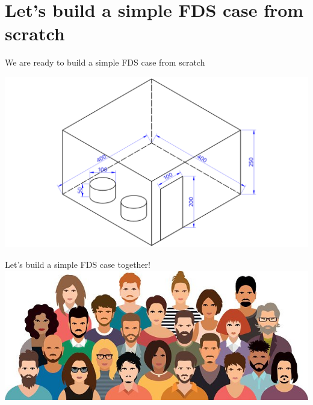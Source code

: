 \documentclass[aspectratio=169]{beamer}
\begin{document}
\section{Let's build a simple FDS case from scratch}
\begin{frame}[fragile]{}
  \centering
  \vfill
  {\fontsize{20}{50}\selectfont We are ready to build \linebreak a simple FDS case from scratch}
  \vfill
\end{frame}

\begin{frame}
  \centering
  \vfill
  \includegraphics[width=\linewidth]{images/case.png}
  \vfill
\end{frame}

\begin{frame}[fragile]{}
  \centering
  \vfill
  {\fontsize{20}{50}\selectfont Let's build a simple FDS case}
  \linebreak
  {\fontsize{40}{50}\selectfont together!}
  \centering
  \vfill
  \includegraphics[width=.65\linewidth]{images/people.jpg}
  \vfill
\end{frame}
\end{document}

